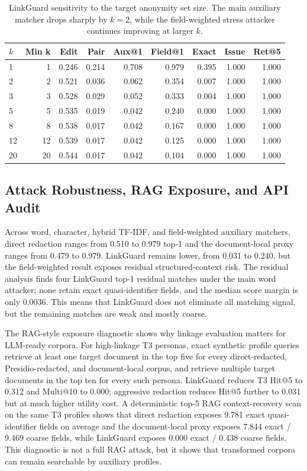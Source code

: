 \documentclass{article}
\newcommand{\method}{LinkGuard}
\begin{document}
\begin{table}[t]
\centering
\scriptsize
\setlength{\tabcolsep}{3pt}
\begin{tabular}{lrrrrrrrr}
\toprule
$k$ & Min k & Edit & Pair & Aux@1 & Field@1 & Exact & Issue & Ret@5 \\
\midrule
1 & 1 & 0.246 & 0.214 & 0.708 & 0.979 & 0.395 & 1.000 & 1.000 \\
2 & 2 & 0.521 & 0.036 & 0.062 & 0.354 & 0.007 & 1.000 & 1.000 \\
3 & 3 & 0.528 & 0.029 & 0.052 & 0.333 & 0.004 & 1.000 & 1.000 \\
5 & 5 & 0.535 & 0.019 & 0.042 & 0.240 & 0.000 & 1.000 & 1.000 \\
8 & 8 & 0.538 & 0.017 & 0.042 & 0.167 & 0.000 & 1.000 & 1.000 \\
12 & 12 & 0.539 & 0.017 & 0.042 & 0.125 & 0.000 & 1.000 & 1.000 \\
20 & 20 & 0.544 & 0.017 & 0.042 & 0.104 & 0.000 & 1.000 & 1.000 \\
\bottomrule
\end{tabular}
\caption{\method{} sensitivity to the target anonymity set size. The main auxiliary matcher drops sharply by $k=2$, while the field-weighted stress attacker continues improving at larger $k$.}
\label{tab:sensitivity}
\end{table}

\subsection{Attack Robustness, RAG Exposure, and API Audit}

Across word, character, hybrid TF-IDF, and field-weighted auxiliary matchers, direct redaction ranges from 0.510 to 0.979 top-1 and the document-local proxy ranges from 0.479 to 0.979.
\method{} remains lower, from 0.031 to 0.240, but the field-weighted result exposes residual structured-context risk.
The residual analysis finds four \method{} top-1 residual matches under the main word attacker; none retain exact quasi-identifier fields, and the median score margin is only 0.0036.
This means that \method{} does not eliminate all matching signal, but the remaining matches are weak and mostly coarse.

The RAG-style exposure diagnostic shows why linkage evaluation matters for LLM-ready corpora.
For high-linkage T3 personas, exact synthetic profile queries retrieve at least one target document in the top five for every direct-redacted, Presidio-redacted, and document-local corpus, and retrieve multiple target documents in the top ten for every such persona.
\method{} reduces T3 Hit@5 to 0.312 and Multi@10 to 0.000; aggressive redaction reduces Hit@5 further to 0.031 but at much higher utility cost.
A deterministic top-5 RAG context-recovery scan on the same T3 profiles shows that direct redaction exposes 9.781 exact quasi-identifier fields on average and the document-local proxy exposes 7.844 exact / 9.469 coarse fields, while \method{} exposes 0.000 exact / 0.438 coarse fields.
This diagnostic is not a full RAG attack, but it shows that transformed corpora can remain searchable by auxiliary profiles.
\end{document}
